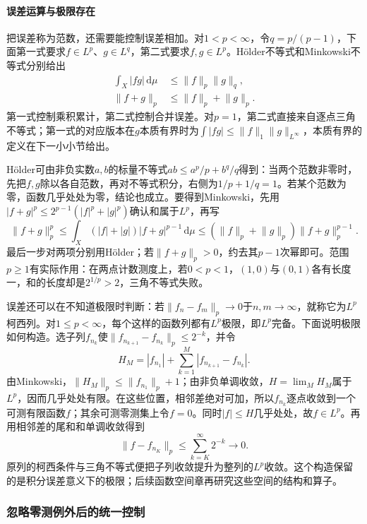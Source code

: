 \paragraph{误差运算与极限存在}

把误差称为范数，还需要能控制误差相加。对$1<p<\infty$，令$q=p/(p-1)$，下面第一式要求$f\in L^p$、$g\in L^q$，第二式要求$f,g\in L^p$。Hölder不等式和Minkowski不等式分别给出
\begin{align}
 \int_X|fg|\,\mathrm d\mu&\leq\lVert f\rVert_p\lVert g\rVert_q,
 \label{eq:measurable-holder}\\
 \lVert f+g\rVert_p&\leq\lVert f\rVert_p+\lVert g\rVert_p.
 \label{eq:measurable-minkowski}
\end{align}
第一式控制乘积累计，第二式控制合并误差。对$p=1$，第二式直接来自逐点三角不等式；第一式的对应版本在$g$本质有界时为$\int|fg|\leq\lVert f\rVert_1\lVert g\rVert_{L^\infty}$，本质有界的定义在下一小小节给出。

Hölder可由非负实数$a,b$的标量不等式$ab\leq a^p/p+b^q/q$得到：当两个范数非零时，先把$f,g$除以各自范数，再对不等式积分，右侧为$1/p+1/q=1$。若某个范数为零，函数几乎处处为零，结论也成立。要得到Minkowski，先用$|f+g|^p\leq2^{p-1}(|f|^p+|g|^p)$确认和属于$L^p$，再写
\[
 \lVert f+g\rVert_p^p
 \leq\int_X(|f|+|g|)|f+g|^{p-1}\,\mathrm d\mu
 \leq(\lVert f\rVert_p+\lVert g\rVert_p)\lVert f+g\rVert_p^{p-1}.
\]
最后一步对两项分别用Hölder；若$\lVert f+g\rVert_p>0$，约去其$p-1$次幂即可。范围$p\geq1$有实际作用：在两点计数测度上，若$0<p<1$，$(1,0)$与$(0,1)$各有长度一，和的长度却是$2^{1/p}>2$，三角不等式失败。

误差还可以在不知道极限时判断：若$\lVert f_n-f_m\rVert_p\to0$于$n,m\to\infty$，就称它为$L^p$柯西列。对$1\leq p<\infty$，每个这样的函数列都有$L^p$极限，即$L^p$完备。下面说明极限如何构造。选子列$f_{n_k}$使$\lVert f_{n_{k+1}}-f_{n_k}\rVert_p\leq2^{-k}$，并令
\[
 H_M=|f_{n_1}|+\sum_{k=1}^M|f_{n_{k+1}}-f_{n_k}|.
\]
由Minkowski，$\lVert H_M\rVert_p\leq\lVert f_{n_1}\rVert_p+1$；由非负单调收敛，$H=\lim_M H_M$属于$L^p$，因而几乎处处有限。在这些位置，相邻差绝对可加，所以$f_{n_k}$逐点收敛到一个可测有限函数$f$；其余可测零测集上令$f=0$。同时$|f|\leq H$几乎处处，故$f\in L^p$。再用相邻差的尾和和单调收敛得到
\[
 \lVert f-f_{n_K}\rVert_p\leq\sum_{k=K}^{\infty}2^{-k}\longrightarrow0.
\]
原列的柯西条件与三角不等式便把子列收敛提升为整列的$L^p$收敛。这个构造保留的是积分误差意义下的极限；后续函数空间章再研究这些空间的结构和算子。

\subsubsection{忽略零测例外后的统一控制}
